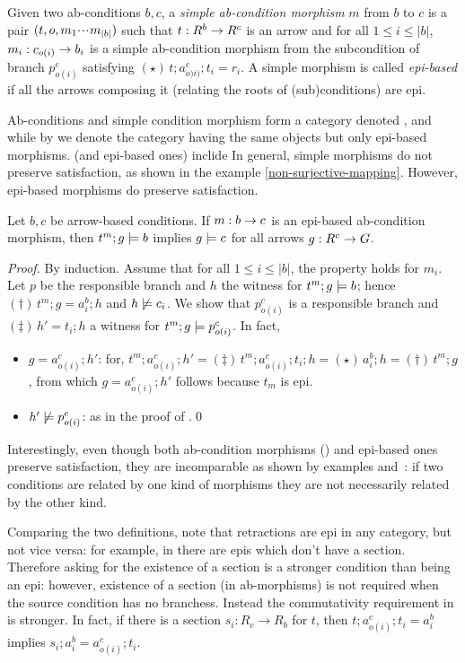 \begin{definition}
  Given two ab-conditions $b,c$, a \emph{simple ab-condition morphism} $m$ from $b$ to $c$ is a pair $(t,o,m_1{\cdotp\mkern-2mu\cdotp\mkern-2mu\cdotp\mkern1mu} m_{|b|})$ such that $t:R^b\rightarrow R^c$ is an arrow and for all $1\leq i\leq |b|$, $m_i:c_{{o(i)}}\rightarrow b_i$ is a simple ab-condition morphism from the subcondition of branch $p^c_{o(i)}$ satisfying $(\star)\, t;a^c_{o)i)};t_i=r_i$. 
  A simple morphism is called \emph{epi-based} if all the arrows composing it (relating the roots of (sub)conditions) are epi. 
\end{definition}
%
Ab-conditions and simple condition morphism form a category denoted , and while by  we denote the category having the same objects but only epi-based morphisms.  (and epi-based ones) inclide
In general, simple morphisms do not preserve satisfaction, as shown in the example \ref{non-surjective-mapping}. However, epi-based morphisms do preserve satisfaction. 


\begin{proposition}
  Let $b,c$ be arrow-based conditions. If $m:b\rightarrow c$ is an epi-based ab-condition morphism, then $t^m;g\models b$ implies $g \models c$ for all arrows $g:R^c\rightarrow G$.
  \end{proposition}
  \emph{Proof.} By induction. Assume that for all $1\leq i\leq |b|$, the property holds for $m_i$. Let $p$ be the responsible branch and $h$ the witness for $t^m;g\models b$; hence $(\dagger)\, t^m;g=a^b_i;h$ and $h\not\models c_i$. We show that $p^c_{o(i)}$ is a responsible branch and $(\ddagger)\, h'=t_i;h$ a witness for $t^m;g\models p^c_{o(i)}$. In fact, 
  \begin{itemize}
  \item $g = a^c_{o(i)};h'$: for, $t^m;a^c_{o(i)};h' =\!(\ddagger)\, t^m;a^c_{o(i)};t_i;h =\!(\star)\, a^b_i; h =\!(\dagger)\, t^m;g$, from which  $g = a^c_{o(i)};h'$ follows because $t_m$ is epi. 
  \item $h'\not\models p^c_{o(i)}$: as in the proof of .\qed
  \end{itemize}
Interestingly, even though both ab-condition morphisms () and epi-based ones preserve satisfaction, they are incomparable as shown by examples  and~: if two conditions are related by one kind of morphisms they are not necessarily related by the other kind. 

Comparing the two definitions, note that retractions are epi in any category, but not vice versa: for example, in  there are epis which don't have a section. Therefore asking for the existence of a section is a stronger condition than being an epi: however, existence of a section (in ab-morphisms) is not required when the source condition has no branchess. Instead the commutativity requirement in  is stronger. In fact, if there is a section $s_i: R_c \to R_b$ for $t$, then  $t;a^c_{o(i)};t_i=a^b_i$ implies $s_i; a^b_i = a^c_{o(i)}; t_i$. 
